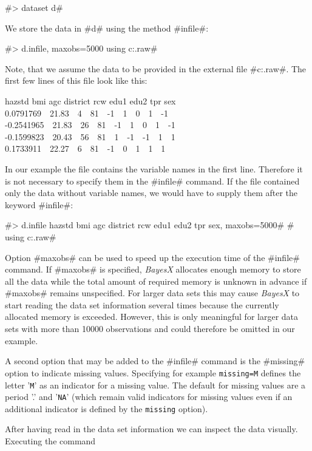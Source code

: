 \documentclass[11pt,a4paper,twoside]{bayesxreport}
\begin{document}
#> dataset d#

We store the data in #d# using the method #infile#:

#> d.infile, maxobs=5000 using c:\data\zambia.raw#

Note, that we assume the data to be provided in the external file
#c:\data\zambia.raw#. The first few lines of this file look like
this:

{\footnotesize
 hazstd bmi agc district rcw edu1 edu2 tpr sex\\
 0.0791769 \,\, 21.83 \,\, 4 \,\, 81 \,\, -1 \,\, 1 \,\, 0 \,\, 1 \,\, -1\\
 -0.2541965 \,\, 21.83 \,\, 26 \,\, 81 \,\, -1 \,\, 1 \,\, 0 \,\, 1 \,\, -1\\
 -0.1599823 \,\, 20.43 \,\, 56 \,\, 81 \,\, 1 \,\, -1 \,\, -1 \,\, 1 \,\, 1\\
 0.1733911 \,\, 22.27 \,\, 6 \,\, 81 \,\, -1 \,\, 0 \,\, 1 \,\, 1 \,\, 1}

In our example the file contains the variable names in the first
line. Therefore it is not necessary to specify them in the #infile#
command. If the file contained only the data without variable names,
we would have to supply them after the keyword #infile#:

 #> d.infile hazstd bmi agc district rcw edu1 edu2 tpr sex, maxobs=5000#
 #  using c:\data\zambia.raw#


Option #maxobs# can be used to speed up the execution time of the
#infile# command. If #maxobs# is specified, {\it BayesX} allocates
enough memory to store all the data while the total amount of
required memory is unknown in advance if #maxobs# remains
unspecified. For larger data sets this may cause {\it BayesX} to
start reading the data set information several times because the
currently allocated memory is exceeded. However, this is only
meaningful for larger data sets with more than 10000 observations
and could therefore be omitted in our example.

A second option that may be added to the #infile# command is the
#missing# option to indicate missing values. Specifying for example
{\tt missing=M} defines the letter '{\tt M}' as an indicator for a
missing value. The default for missing values are a period '.' and
'{\tt NA}' (which remain valid indicators for missing values even if
an additional indicator is defined by the {\tt missing} option).

After having read in the data set information we can inspect the
data visually. Executing the command
\end{document}
